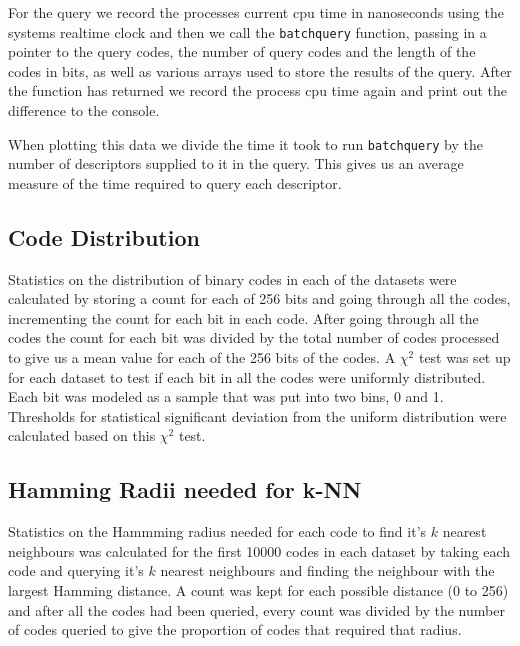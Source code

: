 For the query we record the processes current cpu time in nanoseconds using the systems realtime clock and then we call the \texttt{batchquery} function, passing in a pointer to the query codes, the number of query codes and the length of the codes in bits, as well as various arrays used to store the results of the query. After the function has returned we record the process cpu time again and print out the difference to the console.

When plotting this data we divide the time it took to run \texttt{batchquery} by the number of descriptors supplied to it in the query. This gives us an average measure of the time required to query each descriptor.

\subsection{Code Distribution}
Statistics on the distribution of binary codes in each of the datasets were calculated by storing a count for each of 256 bits and going through all the codes, incrementing the count for each bit in each code. After going through all the codes the count for each bit was divided by the total number of codes processed to give us a mean value for each of the 256 bits of the codes. A $\chi^2$ test was set up for each dataset to test if each bit in all the codes were uniformly distributed. Each bit was modeled as a sample that was put into two bins, 0 and 1. Thresholds for statistical significant deviation from the uniform distribution were calculated based on this $\chi^2$ test.

\subsection{Hamming Radii needed for k-NN}
Statistics on the Hammming radius needed for each code to find it's $k$ nearest neighbours was calculated for the first 10000 codes in each dataset by taking each code and querying it's $k$ nearest neighbours and finding the neighbour with the largest Hamming distance. A count was kept for each possible distance (0 to 256) and after all the codes had been queried, every count was divided by the number of codes queried to give the proportion of codes that required that radius.